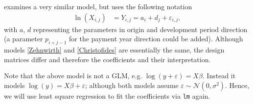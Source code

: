 \documentclass{article}
\begin{document}
\cite{Christofides1997} examines a very similar model, but uses the following 
notation
\begin{align} 
\ln(X_{i,j}) & = Y_{i,j} = a_i + d_j + \varepsilon_{i,j},
\label{Christofides}
\end{align}
with $a$, $d$ representing the parameters in origin and development period 
direction (a parameter $p_{i+j-1}$ for the payment year direction 
could be added). Although models \ref{Zehnwirth} and \ref{Christofides} 
are essentially the same, the design matrices differ and 
therefore the coefficients and their interpretation.


Note that the above model is not a GLM, e.g. 
$\log(y+\varepsilon)=X\beta$. Instead it models
$\log(y)=X\beta+\varepsilon$; 
although both models assume $\varepsilon \sim \mathcal{N}(0,\sigma^2)$.
Hence, we will use least square regression to fit the coefficients
via \texttt{lm} again.
\end{document}
